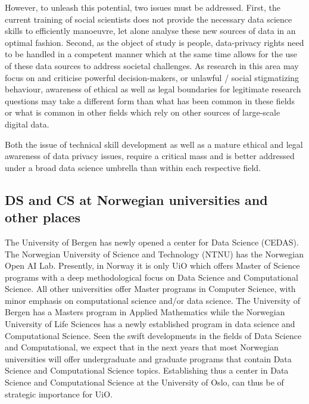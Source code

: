 \documentclass[a4paper,10pt]{article}
\begin{document}
However, to unleash this potential, two issues must be addressed. First, the current training of social scientists does not provide the necessary data science skills to efficiently manoeuvre, let alone analyse these new sources of data in an optimal fashion. Second, as the object of study is people, data-privacy rights need to be handled in a competent manner which at the same time allows for the use of these data sources to address societal challenges. As research in this area may focus on and criticise powerful decision-makers, or unlawful / social stigmatizing behaviour, awareness of ethical as well as legal boundaries for legitimate research questions may take a different form than what has been common in these fields or what is common in other fields which rely on other sources of large-scale digital data. 

Both the issue of technical skill development as well as a mature ethical and legal awareness of data privacy issues, require a critical mass and is better addressed under a broad data science umbrella than within each respective field.  





 
\subsection{DS and CS at Norwegian universities and other places}

The University of Bergen has newly opened a center for Data Science (CEDAS). The Norwegian University of Science and Technology (NTNU) has the Norwegian Open AI Lab. Presently,
in Norway it is only UiO which offers Master of Science programs with a deep methodological focus on Data Science and Computational Science. All other universities offer  Master programs in Computer Science, with minor emphasis on computational science and/or data science. The University of Bergen has a Masters program in Applied Mathematics while the Norwegian University of Life Sciences has a newly established program in data science and  Computational Science. Seen the swift developments in the fields of Data Science and Computational, we expect that in the next years that most Norwegian universities will offer undergraduate and graduate programs that contain Data Science and Computational Science topics. 
Establishing thus a center in Data Science and Computational Science at the University of Oslo, can thus be of strategic importance for UiO.
\end{document}
